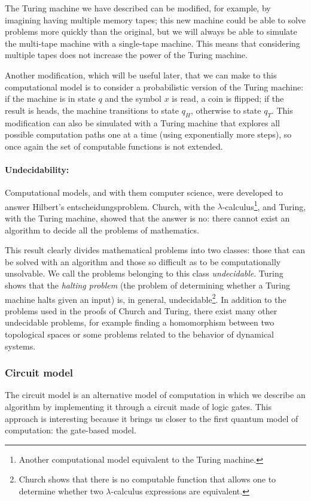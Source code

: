 The Turing machine we have described can be modified, for example, by imagining having multiple memory tapes; this new machine could be able to solve problems more quickly than the original, but we will always be able to simulate the multi-tape machine with a single-tape machine. This means that considering multiple tapes does not increase the power of the Turing machine.

Another modification, which will be useful later, that we can make to this computational model is to consider a probabilistic version of the Turing machine: if the machine is in state $q$ and the symbol $x$ is read, a coin is flipped; if the result is heads, the machine transitions to state $q_H$, otherwise to state $q_T$. This modification can also be simulated with a Turing machine that explores all possible computation paths one at a time (using exponentially more steps), so once again the set of computable functions is not extended.

\paragraph{Undecidability:} Computational models, and with them computer science, were developed to answer Hilbert's entscheidungsproblem. Church, with the $\lambda$-calculus\footnote{Another computational model equivalent to the Turing machine.}, and Turing, with the Turing machine, showed that the answer is no: there cannot exist an algorithm to decide all the problems of mathematics.

This result clearly divides mathematical problems into two classes: those that can be solved with an algorithm and those so difficult as to be computationally unsolvable. We call the problems belonging to this class \emph{undecidable}. Turing shows that the \emph{halting problem} (the problem of determining whether a Turing machine halts given an input) is, in general, undecidable\footnote{Church shows that there is no computable function that allows one to determine whether two $\lambda$-calculus expressions are equivalent.}. In addition to the problems used in the proofs of Church and Turing, there exist many other undecidable problems, for example finding a homomorphism between two topological spaces or some problems related to the behavior of dynamical systems. 

\subsubsection*{Circuit model}
The circuit model is an alternative model of computation in which we describe an algorithm by implementing it through a circuit made of logic gates. This approach is interesting because it brings us closer to the first quantum model of computation: the gate-based model.

